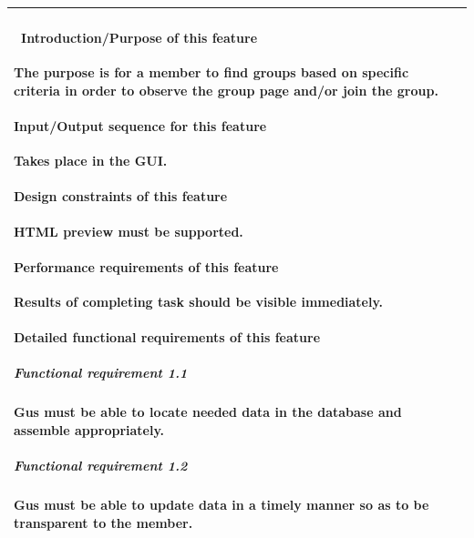 \documentclass[letterpaper]{article}
\begin{document}
\begin{flushleft}
\begin{supertabular}{|m{3.17056in}|m{3.1712599in}|}
\paragraph[\ Introduction/Purpose of this
feature]{\rmfamily \ Introduction/Purpose of
this feature}
{\color{black} The purpose is for a member to find groups based on
specific criteria in order to observe the group page and/or join the
group.}

\paragraph[Input/Output sequence for this
feature]{\rmfamily Input/Output sequence for
this feature}
{\color{black} Takes place in the GUI.}

\paragraph[Design constraints of this
feature]{\rmfamily Design constraints of this
feature}
{\color{black} HTML preview must be supported.}

\paragraph[Performance requirements of this
feature]{\rmfamily Performance requirements of
this feature}
{\color{black} Results of completing task should be visible
immediately.}

\paragraph[Detailed functional requirements of this
feature]{\rmfamily Detailed functional
requirements of this feature}
\subparagraph[Functional requirement 1.1]{
Functional requirement 1.1}
{\color{black} Gus must be able to locate needed data in the database
and assemble appropriately.}

\subparagraph[Functional requirement 1.2]{
Functional requirement 1.2}
{\color{black} Gus must be able to update data in a timely manner so as
to be transparent to the member.}

~
\\\hline
\end{supertabular}
\end{flushleft}

\bigskip
\end{document}
